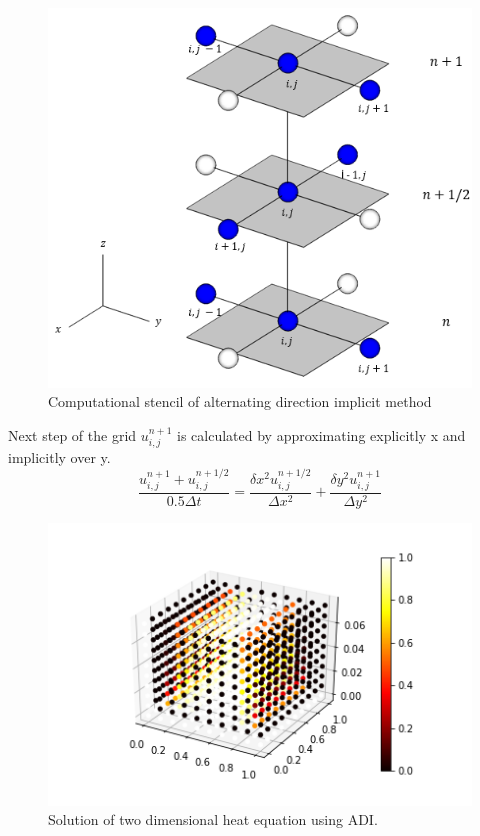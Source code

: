 \documentclass[12pt, oneside]{book}
\theoremstyle{plain}
\theoremstyle{definition}
\begin{document}
\begin{figure}[!htb]
    \centering
        \includegraphics[scale=0.7]{ADI.png}
    \caption{Computational stencil of alternating direction implicit method}
\end{figure}

Next step of the grid $u^{n+1}_{i,j}$ is calculated by approximating explicitly x and implicitly over y.
\begin{equation}
\frac{u^{n+1}_{i,j} + u^{n+1/2}_{i,j}}{0.5 \Delta t} = \frac{\delta x^2 u^{n+1/2}_{i,j} }{\Delta x^2} + \frac{\delta y^2 u^{n+1}_{i,j}}{\Delta y^2}
\end{equation}

\begin{figure}[!htb]
    \centering
        \includegraphics[scale=0.6]{ADIHeat.png}
    \caption{Solution of two dimensional heat equation using ADI.}
\end{figure}
\end{document}
